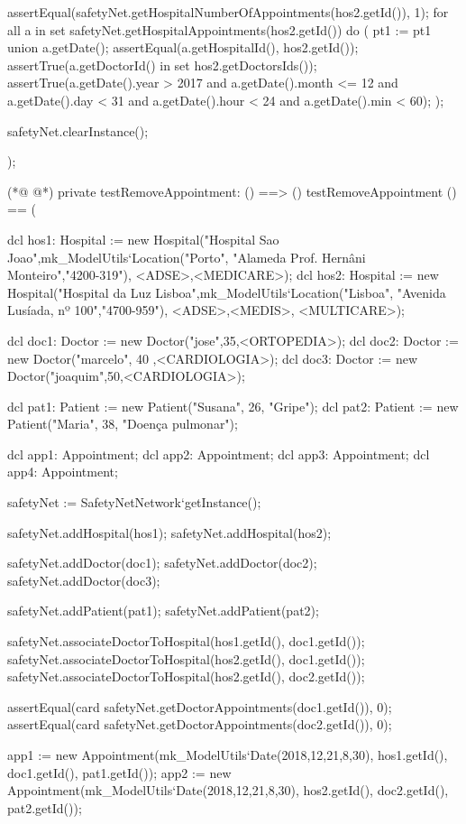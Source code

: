 \begin{vdmpp}[breaklines=true]
  assertEqual(safetyNet.getHospitalNumberOfAppointments(hos2.getId()), 1);  
  for all a in set safetyNet.getHospitalAppointments(hos2.getId()) do (
   pt1 := pt1 union {a.getDate()};
   assertEqual(a.getHospitalId(), hos2.getId());
   assertTrue(a.getDoctorId() in set hos2.getDoctorsIds());
   assertTrue(a.getDate().year > 2017 and a.getDate().month <= 12 and a.getDate().day < 31 and a.getDate().hour < 24 and a.getDate().min < 60);
  );
  
  
  safetyNet.clearInstance();
    
);


 
(*@
\label{testRemoveAppointment:664}
@*)
private testRemoveAppointment: () ==> ()
 testRemoveAppointment () == (
 
  dcl hos1: Hospital := new Hospital("Hospital Sao Joao",mk_ModelUtils`Location("Porto", "Alameda Prof. Hernâni Monteiro","4200-319"), {<ADSE>,<MEDICARE>});
  dcl hos2: Hospital := new Hospital("Hospital da Luz Lisboa",mk_ModelUtils`Location("Lisboa", "Avenida Lusíada, nº 100","4700-959"), {<ADSE>,<MEDIS>, <MULTICARE>});
  
  dcl doc1: Doctor := new Doctor("jose",35,<ORTOPEDIA>);
  dcl doc2: Doctor := new Doctor("marcelo", 40 ,<CARDIOLOGIA>);
  dcl doc3: Doctor := new Doctor("joaquim",50,<CARDIOLOGIA>);
  
  dcl pat1: Patient := new Patient("Susana", 26, "Gripe");
  dcl pat2: Patient := new Patient("Maria", 38, "Doença pulmonar");
  
  dcl app1: Appointment;
  dcl app2: Appointment;
  dcl app3: Appointment;
  dcl app4: Appointment;
  
  safetyNet := SafetyNetNetwork`getInstance();
   
  safetyNet.addHospital(hos1);
  safetyNet.addHospital(hos2);
  
  safetyNet.addDoctor(doc1);
  safetyNet.addDoctor(doc2);
  safetyNet.addDoctor(doc3);
  
  safetyNet.addPatient(pat1);
  safetyNet.addPatient(pat2);

  safetyNet.associateDoctorToHospital(hos1.getId(), doc1.getId());
  safetyNet.associateDoctorToHospital(hos2.getId(), doc1.getId());
  safetyNet.associateDoctorToHospital(hos2.getId(), doc2.getId());

  assertEqual(card safetyNet.getDoctorAppointments(doc1.getId()), 0);
  assertEqual(card safetyNet.getDoctorAppointments(doc2.getId()), 0);

  app1 := new Appointment(mk_ModelUtils`Date(2018,12,21,8,30), hos1.getId(), doc1.getId(), pat1.getId());
  app2 := new Appointment(mk_ModelUtils`Date(2018,12,21,8,30), hos2.getId(), doc2.getId(), pat2.getId());


\end{vdmpp}
